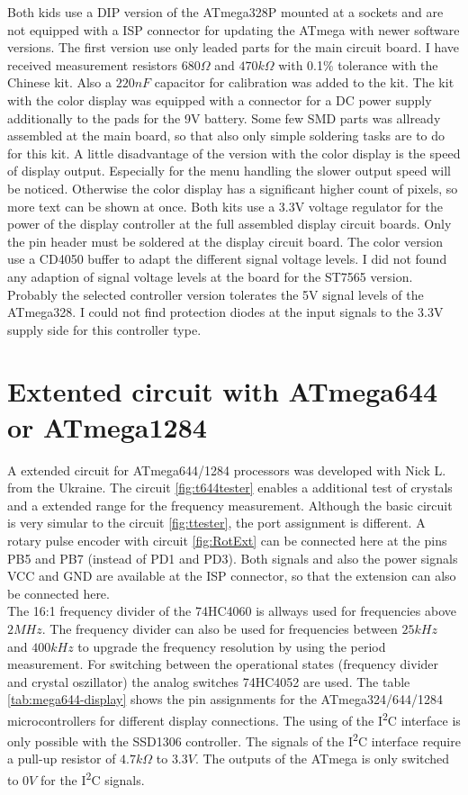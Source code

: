 Both kids use a DIP version of the ATmega328P mounted at a sockets and are
not equipped with a ISP connector for updating the ATmega with newer software versions.
The first version use
only leaded parts for the main circuit board. 
I have received measurement resistors \(680\Omega\) and \(470k\Omega\) with 0.1\% tolerance
with the Chinese kit. Also a \(220 nF\) capacitor for calibration was added
to the kit.
The kit with the color display was equipped with a connector for a DC power supply additionally
to the pads for the 9V battery.
Some few SMD parts was allready assembled at the main board, so that also only simple soldering
tasks are to do for this kit. 
A little disadvantage of the version with the color display is the speed of display output.
Especially for the menu handling the slower output speed will be noticed.
Otherwise the color display has a significant higher count of pixels, so more text can be shown at once.
Both kits use a 3.3V voltage regulator for the power of the display controller at the
full assembled display circuit boards.
Only the pin header must be soldered at the display circuit board.
The color version use a CD4050 buffer to adapt the different signal voltage levels.
I did not found any adaption of signal voltage levels at the board for the ST7565 version.
Probably the selected controller version tolerates the 5V signal levels of the ATmega328.
I could not find protection diodes at the input signals to the 3.3V supply side for this controller type.


\section{Extented circuit with ATmega644 or ATmega1284}

A extended circuit for ATmega644/1284 processors was developed with Nick L. from the Ukraine.
The circuit \ref{fig:t644tester} enables a additional test of crystals and a extended range
for the frequency measurement.
Although the basic circuit is very simular to the circuit \ref{fig:ttester}, the
port assignment is different.
A rotary pulse encoder with circuit \ref{fig:RotExt} can be connected here at the pins PB5 and PB7 (instead of PD1 and PD3).
Both signals and also the power signals VCC and GND are available at the ISP connector,
so that the extension can also be connected here.\\

The 16:1 frequency divider of the 74HC4060 is allways used for frequencies above \(2MHz\).
The frequency divider can also be used for frequencies between \(25kHz\) and \(400kHz\) to
upgrade the frequency resolution by using the period measurement.
For switching between the operational states (frequency divider and crystal oszillator)
the analog switches 74HC4052 are used.
The table \ref{tab:mega644-display} shows the pin assignments for the ATmega324/644/1284
microcontrollers for different display connections.
The using of the I\textsuperscript{2}C interface is only possible with the SSD1306 controller.
The signals of the I\textsuperscript{2}C interface require a pull-up resistor of \(4.7k\Omega\) to \(3.3V\).
The outputs of the ATmega is only switched to \(0V\) for the I\textsuperscript{2}C signals.


